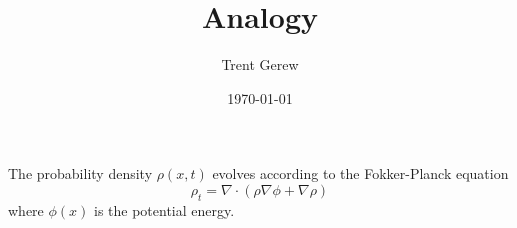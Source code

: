 \documentclass[11pt]{amsart}
\date{\today}%
\begin{document}
\title{Analogy}
\author{Trent Gerew}

\maketitle

	The probability density $\rho (x,t)$ evolves according to the Fokker-Planck equation
	\begin{equation} \label{eq:f-p}
		\rho_t = \nabla \cdot \left( \rho \nabla \phi + \nabla \rho \right)
	\end{equation}
	where $\phi (x)$ is the potential energy.
\end{document}
